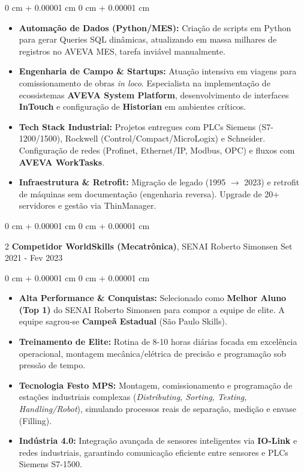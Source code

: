 \documentclass[10pt, letterpaper]{article}
\newenvironment{highlights}{ \begin{itemize}[ topsep=0.10 cm, parsep=0.10 cm, partopsep=0pt,
itemsep=0pt, leftmargin=0 cm + 10pt ] }{ \end{itemize} } %
\newenvironment{onecolentry}{ \begin{adjustwidth}{ 0 cm + 0.00001 cm }{ 0 cm + 0.00001 cm }
}{ \end{adjustwidth} } %
\newenvironment{twocolentry}[2][]{ \onecolentry \def\secondColumn{#2} \setcolumnwidth{\fill, 4.5 cm}
\begin{paracol}{2} }{ \switchcolumn \raggedleft \secondColumn \end{paracol}
\endonecolentry } %
\begin{document}
	\vspace{0.10 cm}
	\begin{onecolentry}
		\begin{highlights}
			\item \textbf{Automação de Dados (Python/MES):} Criação de scripts em Python para gerar Queries SQL dinâmicas, atualizando em massa milhares de registros no AVEVA MES, tarefa inviável manualmente.
            \item \textbf{Engenharia de Campo \& Startups:} Atuação intensiva em viagens para comissionamento de obras \textit{in loco}. Especialista na implementação de ecossistemas \textbf{AVEVA System Platform}, desenvolvimento de interfaces \textbf{InTouch} e configuração de \textbf{Historian} em ambientes críticos.
            \item \textbf{Tech Stack Industrial:} Projetos entregues com PLCs Siemens (S7-1200/1500), Rockwell (Control/Compact/MicroLogix) e Schneider. Configuração de redes (Profinet, Ethernet/IP, Modbus, OPC) e fluxos com \textbf{AVEVA WorkTasks}.
            \item \textbf{Infraestrutura \& Retrofit:} Migração de legado (1995 $\rightarrow$ 2023) e retrofit de máquinas sem documentação (engenharia reversa). Upgrade de 20+ servidores e gestão via ThinManager.
		\end{highlights}
	\end{onecolentry}

    \vspace{0.2 cm}

    \begin{twocolentry}
		{ Set 2021 - Fev 2023 } \textbf{Competidor WorldSkills (Mecatrônica)}, SENAI Roberto Simonsen
	\end{twocolentry}
	
	\vspace{0.10 cm}
	\begin{onecolentry}
		\begin{highlights}
            \item \textbf{Alta Performance \& Conquistas:} Selecionado como \textbf{Melhor Aluno (Top 1)} do SENAI Roberto Simonsen para compor a equipe de elite. A equipe sagrou-se \textbf{Campeã Estadual} (São Paulo Skills).
            \item \textbf{Treinamento de Elite:} Rotina de 8-10 horas diárias focada em excelência operacional, montagem mecânica/elétrica de precisão e programação sob pressão de tempo.
			\item \textbf{Tecnologia Festo MPS:} Montagem, comissionamento e programação de estações industriais complexas (\textit{Distributing, Sorting, Testing, Handling/Robot}), simulando processos reais de separação, medição e envase (Filling).
            \item \textbf{Indústria 4.0:} Integração avançada de sensores inteligentes via \textbf{IO-Link} e redes industriais, garantindo comunicação eficiente entre sensores e PLCs Siemens S7-1500.
		\end{highlights}
	\end{onecolentry}
	
\end{document}
